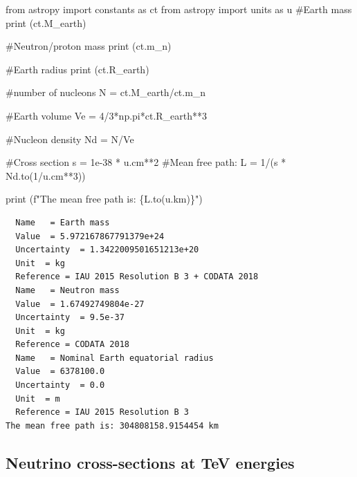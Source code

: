 \documentclass[
  letterpaper,
  DIV=11,
  numbers=noendperiod]{scrreprt}
\newenvironment{Shaded}{\begin{snugshade}}{\end{snugshade}}
\newcommand{\BuiltInTok}[1]{\textcolor[rgb]{0.00,0.23,0.31}{#1}}
\newcommand{\CommentTok}[1]{\textcolor[rgb]{0.37,0.37,0.37}{#1}}
\newcommand{\DecValTok}[1]{\textcolor[rgb]{0.68,0.00,0.00}{#1}}
\newcommand{\FloatTok}[1]{\textcolor[rgb]{0.68,0.00,0.00}{#1}}
\newcommand{\ImportTok}[1]{\textcolor[rgb]{0.00,0.46,0.62}{#1}}
\newcommand{\NormalTok}[1]{\textcolor[rgb]{0.00,0.23,0.31}{#1}}
\newcommand{\OperatorTok}[1]{\textcolor[rgb]{0.37,0.37,0.37}{#1}}
\newcommand{\SpecialCharTok}[1]{\textcolor[rgb]{0.37,0.37,0.37}{#1}}
\newcommand{\SpecialStringTok}[1]{\textcolor[rgb]{0.13,0.47,0.30}{#1}}
\begin{document}
\begin{Shaded}
\begin{Highlighting}[]
\ImportTok{from}\NormalTok{ astropy }\ImportTok{import}\NormalTok{ constants }\ImportTok{as}\NormalTok{ ct}
\ImportTok{from}\NormalTok{ astropy }\ImportTok{import}\NormalTok{ units }\ImportTok{as}\NormalTok{ u}
\CommentTok{\#Earth mass}
\BuiltInTok{print}\NormalTok{ (ct.M\_earth)}

\CommentTok{\#Neutron/proton mass}
\BuiltInTok{print}\NormalTok{ (ct.m\_n)}

\CommentTok{\#Earth radius}
\BuiltInTok{print}\NormalTok{ (ct.R\_earth)}

\CommentTok{\#number of nucleons}
\NormalTok{N }\OperatorTok{=}\NormalTok{ ct.M\_earth}\OperatorTok{/}\NormalTok{ct.m\_n }

\CommentTok{\#Earth volume}
\NormalTok{Ve }\OperatorTok{=} \DecValTok{4}\OperatorTok{/}\DecValTok{3}\OperatorTok{*}\NormalTok{np.pi}\OperatorTok{*}\NormalTok{ct.R\_earth}\OperatorTok{**}\DecValTok{3}

\CommentTok{\#Nucleon density}
\NormalTok{Nd }\OperatorTok{=}\NormalTok{ N}\OperatorTok{/}\NormalTok{Ve}

\CommentTok{\#Cross section}
\NormalTok{s }\OperatorTok{=} \FloatTok{1e{-}38} \OperatorTok{*}\NormalTok{ u.cm}\OperatorTok{**}\DecValTok{2}
\CommentTok{\#Mean free path:}
\NormalTok{L }\OperatorTok{=} \DecValTok{1}\OperatorTok{/}\NormalTok{(s }\OperatorTok{*}\NormalTok{ Nd.to(}\DecValTok{1}\OperatorTok{/}\NormalTok{u.cm}\OperatorTok{**}\DecValTok{3}\NormalTok{))}

\BuiltInTok{print}\NormalTok{ (}\SpecialStringTok{f"The mean free path is: }\SpecialCharTok{\{}\NormalTok{L}\SpecialCharTok{.}\NormalTok{to(u.km)}\SpecialCharTok{\}}\SpecialStringTok{"}\NormalTok{)}
\end{Highlighting}
\end{Shaded}

\begin{verbatim}
  Name   = Earth mass
  Value  = 5.972167867791379e+24
  Uncertainty  = 1.3422009501651213e+20
  Unit  = kg
  Reference = IAU 2015 Resolution B 3 + CODATA 2018
  Name   = Neutron mass
  Value  = 1.67492749804e-27
  Uncertainty  = 9.5e-37
  Unit  = kg
  Reference = CODATA 2018
  Name   = Nominal Earth equatorial radius
  Value  = 6378100.0
  Uncertainty  = 0.0
  Unit  = m
  Reference = IAU 2015 Resolution B 3
The mean free path is: 304808158.9154454 km
\end{verbatim}

\subsection*{Neutrino cross-sections at TeV
energies}\label{neutrino-cross-sections-at-tev-energies}
\end{document}
